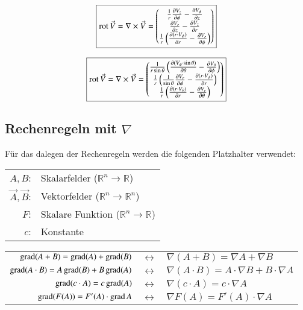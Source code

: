 \[
    \boxed{
        \operatorname{rot} \vec{V}
        = \nabla \times \vec{V}
        = \begin{pmatrix}
            \frac{1}{r}\frac{\partial V_z}{\partial \phi} - \frac{\partial V_\phi}{\partial z}\\
            \frac{\partial V_r}{\partial z} - \frac{\partial V_z}{\partial r}\\
            \frac{1}{r} \left(\frac{\partial (r \cdot V_\phi)}{\partial r} - \frac{\partial V_r}{\partial \phi}\right)\\
        \end{pmatrix}
    }
\]

\[
    \boxed{
        \operatorname{rot} \vec{V}
        = \nabla \times \vec{V}
        = \begin{pmatrix}
            \frac{1}{r \sin \theta} \left(\frac{\partial (V_\phi \cdot \sin \theta)}{\partial \theta} - \frac{\partial V_\theta}{\partial \phi}\right)\\
            \frac{1}{r} \left(\frac{1}{\sin \theta} \frac{\partial V_r}{\partial \phi} - \frac{\partial (r \cdot V_\phi)}{\partial r}\right)\\
            \frac{1}{r} \left(\frac{\partial (r \cdot V_\theta)}{\partial r} - \frac{\partial V_r}{\partial \theta}\right)\\
        \end{pmatrix}
    }
\]


\subsection[Rechenregeln mit Nabla]{Rechenregeln mit $\nabla$}
Für das dalegen der Rechenregeln werden die folgenden Platzhalter verwendet:
\begin{center}\begin{tabular}[]{r l}
    $A, B$: & Skalarfelder ($\mathbb{R}^n \to \mathbb{R}$) \\
    $\vec{A}, \vec{B}$: & Vektorfelder ($\mathbb{R}^n \to \mathbb{R}^n$) \\
    $F$: & Skalare Funktion ($\mathbb{R}^n \to \mathbb{R}$) \\
    $c$: & Konstante \\
\end{tabular}\end{center}

\begin{center}
    \begin{tabular}[]{r c l}
        $ \operatorname{grad}(A+B) = \operatorname{grad}(A) + \operatorname{grad} (B) $ & $\leftrightarrow$ & $ \nabla (A + B) = \nabla A + \nabla B $ \\
        $ \operatorname{grad}(A \cdot B) = A \operatorname{grad}(B) + B \operatorname{grad} (A) $ & $\leftrightarrow$ & $ \nabla (A \cdot B) = A \cdot \nabla B + B \cdot \nabla A $ \\
        $ \operatorname{grad}(c \cdot A) = c \operatorname{grad}(A) $ & $\leftrightarrow$ & $ \nabla (c \cdot A) = c \cdot \nabla A $ \\
        $ \operatorname{grad}(F(A)) = F'(A) \cdot \operatorname{grad} A $ & $\leftrightarrow$ & $ \nabla F(A) = F'(A) \cdot \nabla A $ \\
    \end{tabular}
\end{center}


